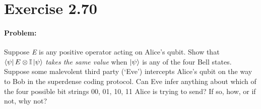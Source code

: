 \section*{Exercise 2.70}
\paragraph{Problem:} Suppose \textit{E} is any positive operator acting on Alice's qubit. Show that $\bra{\psi} E \otimes \mathbb{I} \ket{\psi}$ \textit{takes the same value} when $\ket{\psi}$ is any of the four Bell states. Suppose some malevolent third party (`Eve') intercepts Alice's qubit on the way to Bob in the superdense coding protocol. Can Eve infer anything about which of the four possible bit strings 00, 01, 10, 11 Alice is trying to send? If so, how, or if not, why not? 


